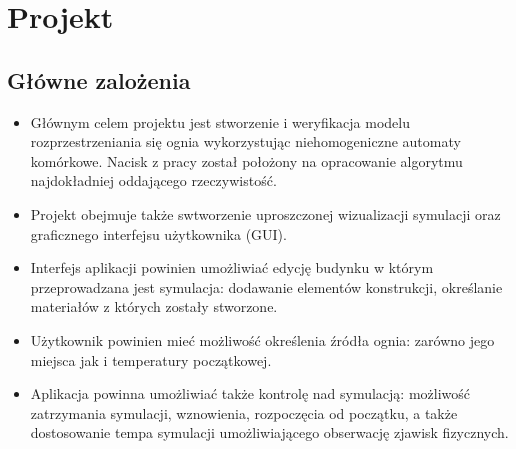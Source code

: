 \chapter {Projekt}
\label{cha:projekt}
\section {Główne zalożenia}
\begin {itemize}
\item Głównym celem projektu jest stworzenie i weryfikacja modelu rozprzestrzeniania się ognia wykorzystując niehomogeniczne automaty
komórkowe. Nacisk z pracy został położony na opracowanie algorytmu najdokładniej oddającego rzeczywistość.
\item Projekt obejmuje także swtworzenie uproszczonej wizualizacji symulacji oraz graficznego interfejsu użytkownika (GUI).
\item Interfejs aplikacji powinien umożliwiać edycję budynku w którym przeprowadzana jest symulacja: dodawanie elementów konstrukcji, 
określanie materiałów z których zostały stworzone. 
\item Użytkownik powinien mieć możliwość określenia źródła ognia: zarówno jego miejsca jak i temperatury początkowej.
\item Aplikacja powinna umożliwiać także kontrolę nad symulacją: możliwość zatrzymania symulacji, wznowienia, rozpoczęcia od początku,
a także dostosowanie tempa symulacji umożliwiającego obserwację zjawisk fizycznych.
\end {itemize}
